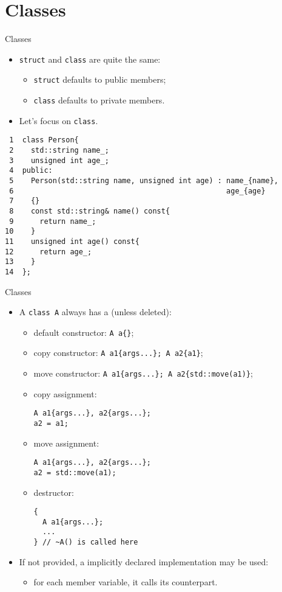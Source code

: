 \documentclass[presentation]{beamer}
\begin{document}
\section{Classes}
\label{sec:org6d3733f}
\begin{frame}[label={sec:org03601a1},fragile]{Classes}
 \begin{itemize}
\item \texttt{struct} and \texttt{class} are quite the same:
\begin{itemize}
\item \texttt{struct} defaults to public members;
\item \texttt{class} defaults to private members.
\end{itemize}
\item Let's focus on \texttt{class}.
\end{itemize}

\begin{verbatim}
 1  class Person{
 2    std::string name_;
 3    unsigned int age_;
 4  public:
 5    Person(std::string name, unsigned int age) : name_{name},
 6                                                 age_{age}
 7    {}
 8    const std::string& name() const{
 9      return name_;
10    }
11    unsigned int age() const{
12      return age_;
13    }
14  };
\end{verbatim}
\end{frame}

\begin{frame}[label={sec:org305c311},fragile]{Classes}
 \begin{itemize}
\item A \texttt{class A} always has a (unless deleted):
\begin{itemize}
\item default constructor: \texttt{A a\{\}};
\item copy constructor: \texttt{A a1\{args...\}; A a2\{a1\}};
\item move constructor: \texttt{A a1\{args...\}; A a2\{std::move(a1)\}};
\item copy assignment:
\begin{verbatim}
A a1{args...}, a2{args...};
a2 = a1;
\end{verbatim}
\item move assignment:
\begin{verbatim}
A a1{args...}, a2{args...};
a2 = std::move(a1);
\end{verbatim}
\item destructor:
\begin{verbatim}
{
  A a1{args...};
  ...
} // ~A() is called here
\end{verbatim}
\end{itemize}
\item If not provided, a implicitly declared implementation may be
used:
\begin{itemize}
\item for each member variable, it calls its counterpart.
\end{itemize}
\end{itemize}
\end{frame}
\end{document}
